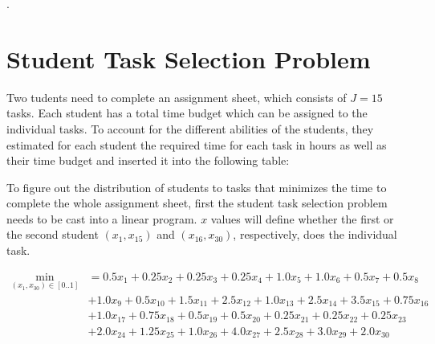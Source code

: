 \documentclass[12pt]{article}         %
\begin{document}
	.


\section{Student Task Selection Problem}

Two tudents need to complete an assignment sheet, which consists of $J= 15$ tasks.  Each student has a total time budget which can be assigned to the individual tasks. To account for the different abilities of the students, they estimated for each student the required time for each task in hours as well as their time budget and inserted it into the following table:

\begin{table}[h]
\end{table}

To figure out the distribution of students to tasks that minimizes the time to complete the whole assignment sheet, first the student task selection problem needs to be cast into a linear program. $x$ values will define whether the first or the second student  $(x_1, x_{15})$ and $(x_{16}, x_{30})$, respectively, does the individual task.
 
 $$
 \begin{aligned}
 \min_{(x_1,x_{30})\in[0 .. 1]} &= 0.5x_1 + 0.25x_2 + 0.25x_3 + 0.25x_4 + 1.0x_5 + 1.0x_6+ 0.5x_7 + 0.5x_8\\&+ 1.0x_9 +0.5x_{10}+ 1.5x_{11}+ 2.5x_{12}+ 1.0x_{13}+ 2.5x_{14}+ 3.5x_{15}+
 0.75x_{16}\\ &+ 1.0x_{17}+  0.75x_{18}+ 0.5 x_{19}+ 0.5x_{20}+ 0.25x_{21}+ 0.25x_{22}+ 0.25x_{23}\\ &+2.0x_{24}+ 1.25x_{25}+1.0x_{26}+ 4.0x_{27}+ 2.5x_{28}+ 3.0 x_{29}+ 2.0x_{30}
 \end{aligned}
$$
\end{document}

